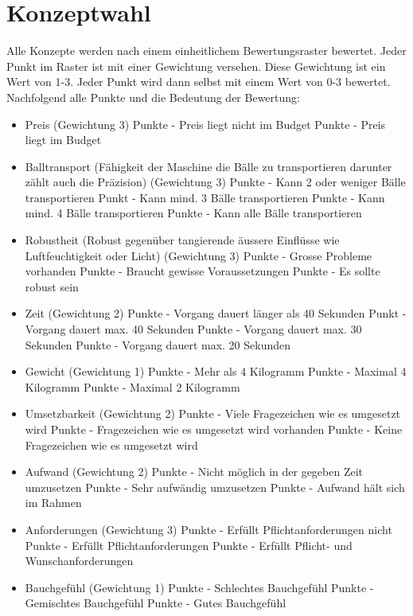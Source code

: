 \section{Konzeptwahl}
Alle Konzepte werden nach einem einheitlichem Bewertungsraster bewertet. Jeder Punkt im Raster ist mit einer Gewichtung versehen. Diese Gewichtung ist ein Wert von 1-3. Jeder Punkt wird dann selbst mit einem Wert von 0-3 bewertet. Nachfolgend alle Punkte und die Bedeutung der Bewertung:\newline
\begin{itemize}
	\item Preis (Gewichtung 3)
	 Punkte - Preis liegt nicht im Budget
	 Punkte - Preis liegt im Budget
	
	\item Balltransport (Fähigkeit der Maschine die Bälle zu transportieren darunter zählt auch die Präzision) (Gewichtung 3)
	 Punkte - Kann 2 oder weniger Bälle transportieren
	 Punkt - Kann mind. 3 Bälle transportieren
	 Punkte - Kann mind. 4 Bälle transportieren
	 Punkte - Kann alle Bälle transportieren
	
	\item Robustheit (Robust gegenüber tangierende äussere Einflüsse wie Luftfeuchtigkeit oder Licht) (Gewichtung 3)
	 Punkte - Grosse Probleme vorhanden
	 Punkte - Braucht gewisse Voraussetzungen
	 Punkte - Es sollte robust sein
	
	\item Zeit (Gewichtung 2)
	 Punkte - Vorgang dauert länger als 40 Sekunden
	 Punkt - Vorgang dauert max. 40 Sekunden
	 Punkte - Vorgang dauert max. 30 Sekunden
	 Punkte - Vorgang dauert max. 20 Sekunden
	
	\item Gewicht (Gewichtung 1)
	 Punkte - Mehr als 4 Kilogramm
	 Punkte - Maximal 4 Kilogramm
	 Punkte - Maximal 2 Kilogramm
	
	\item Umsetzbarkeit (Gewichtung 2)
	 Punkte - Viele Fragezeichen wie es umgesetzt wird
	 Punkte - Fragezeichen wie es umgesetzt wird vorhanden
	 Punkte - Keine Fragezeichen wie es umgesetzt wird
	
	\item Aufwand (Gewichtung 2)
	 Punkte - Nicht möglich in der gegeben Zeit umzusetzen
	 Punkte - Sehr aufwändig umzusetzen
	 Punkte - Aufwand hält sich im Rahmen	
	
	\item Anforderungen (Gewichtung 3)
	 Punkte - Erfüllt Pflichtanforderungen nicht
	 Punkte - Erfüllt Pflichtanforderungen
	 Punkte - Erfüllt Pflicht- und Wunschanforderungen
	
	\item Bauchgefühl (Gewichtung 1)
	 Punkte - Schlechtes Bauchgefühl
	 Punkte - Gemischtes Bauchgefühl
	 Punkte - Gutes Bauchgefühl
\end{itemize}
